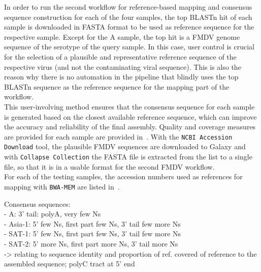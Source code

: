 In order to run the second workflow for reference-based mapping and consensus sequence construction for each of the four samples, the top \ac{BLAST}n hit of each sample is downloaded in FASTA format to be used as reference sequence for the respective sample. Except for the A sample, the top hit is a \ac{FMDV} genome sequence of the serotype of the query sample. In this case, user control is crucial for the selection of a plausible and representative reference sequence of the respective virus (and not the contaminating viral sequence). This is also the reason why there is no automation in the pipeline that blindly uses the top \ac{BLAST}n sequence as the reference sequence for the mapping part of the workflow.\\
This user-involving method ensures that the consensus sequence for each sample is generated based on the closest available reference sequence, which can improve the accuracy and reliability of the final assembly. Quality and coverage measures are provided for each sample are provided in~. With the \texttt{NCBI Accession Download} tool, the plausible \ac{FMDV} sequences are downloaded to Galaxy and with \texttt{Collapse Collection} the FASTA file is extracted from the list to a single file, so that it is in a usable format for the second \ac{FMDV} workflow.\\
For each of the testing samples, the accession numbers used as references for mapping with \texttt{BWA-MEM} are listed in~. 

\todoit
Consensus sequences:\\
- A: 3' tail: polyA, very few Ns\\
- Asia-1: 5' few Ns, first part few Ns, 3' tail few more Ns\\
- SAT-1: 5' few Ns, first part few Ns, 3' tail few more Ns\\
- SAT-2: 5' more Ns, first part more Ns, 3'  tail more Ns\\
-> relating to sequence identity and proportion of ref. covered of reference to the assembled sequence; polyC tract at 5' end


